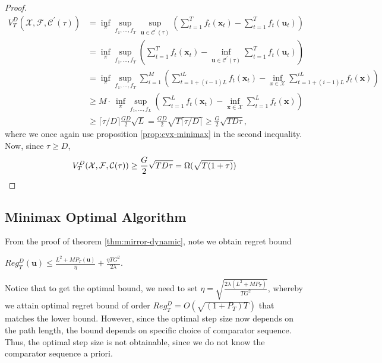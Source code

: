 \documentclass[12pt, a4paper]{report}
\begin{document}
\begin{proof}
\begin{align*}
    V_T^D(\mathcal{X}, \mathcal{F}, \mathcal{C}^\prime(\tau)) &= \inf_{\pi} \sup_{f_1, \dots, f_T} \sup_{\mathbf{u} \in \mathcal{C}^\prime(\tau)} \left( \sum_{t=1}^T f_t(\mathbf{x}_t) - \sum_{t=1}^T f_t(\mathbf{u}_t) \right) \\
    &= \inf_{\pi} \sup_{f_1, \dots, f_T} \left( \sum_{t=1}^T f_t(\mathbf{x}_t) - \inf_{\mathbf{u} \in \mathcal{C}^\prime(\tau)} \sum_{t=1}^T f_t(\mathbf{u}_t) \right) \\
    &= \inf_{\pi} \sup_{f_1, \dots, f_T} \sum_{i=1}^M \left( \sum_{t=1 + (i - 1)L}^{iL} f_t(\mathbf{x}_t) - \inf_{x \in \mathcal{X}} \sum_{t=1 + (i - 1)L}^{iL} f_t(\mathbf{x})\right)
    \\
    &\geq M \cdot\ \inf_{\pi} \sup_{f_1, \dots, f_L} \left( \sum_{t=1}^{L} f_t(\mathbf{x}_t) - \inf_{\mathbf{x} \in \mathcal{X}} \sum_{t=1}^{L} f_t(\mathbf{x}) \right)
    \\
    &\geq \lceil \tau / D \rceil \frac{GD}{2} \sqrt{L} = \frac{GD}{2} \sqrt{T \lceil \tau / D \rceil} \geq \frac{G}{2}\sqrt{TD\tau},
\end{align*}
where we once again use proposition \ref{prop:cvx-minimax} in the second inequality. Now, since $\tau \geq D$,
\begin{equation*}
    V_T^D(\mathcal{X}, \mathcal{F}, \mathcal{C}(\tau)) \geq \frac{G}{2} \sqrt{TD\tau} = \Omega(\sqrt{T(1 + \tau)}) \qedhere
\end{equation*}
\end{proof}

\subsection{Minimax Optimal Algorithm}
From the proof of theorem \ref{thm:mirror-dynamic}, note we obtain regret bound 
\begin{center}
    $\displaystyle Reg_{T}^{D}(\mathbf{u}) \leq \frac{L^2 + MP_T(\mathbf{u})}{\eta} + \frac{\eta TG^2}{2\lambda}$.
\end{center}
Notice that to get the optimal bound, we need to set $\eta = \sqrt{\frac{2\lambda(L^2 + MP_T)}{TG^2}}$, whereby we attain optimal regret bound of order $Reg_{T}^{D} = O(\sqrt{(1+P_T)T})$ that matches the lower bound.
However, since the optimal step size now depends on the path length, the bound depends on specific choice of comparator sequence. Thus, the optimal step size is not obtainable, since we do not know the comparator sequence a priori. 
\end{document}
